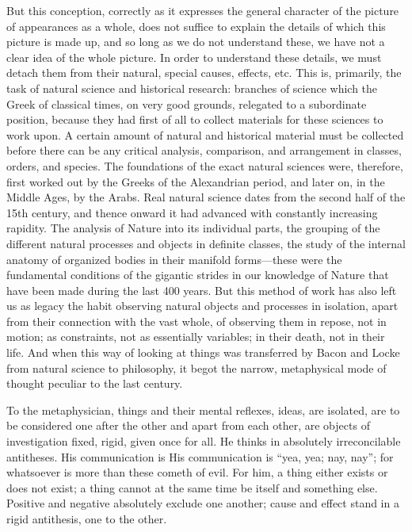 But this conception, correctly as it expresses the general character of the
picture of appearances as a whole, does not suffice to explain the details of
which this picture is made up, and so long as we do not understand these, we
have not a clear idea of the whole picture. In order to understand these
details, we must detach them from their natural, special causes, effects, etc.
This is, primarily, the task of natural science and historical research:
branches of science which the Greek of classical times, on very good grounds,
relegated to a subordinate position, because they had first of all to collect
materials for these sciences to work upon. A certain amount of natural and
historical material must be collected before there can be any critical
analysis, comparison, and arrangement in classes, orders, and species. The
foundations of the exact natural sciences were, therefore, first worked out by
the Greeks of the Alexandrian period, and later on, in the Middle Ages, by the Arabs. Real natural science dates
from the second half of the 15th century, and thence onward it had advanced
with constantly increasing rapidity. The analysis of Nature into its individual
parts, the grouping of the different natural processes and objects in definite
classes, the study of the internal anatomy of organized bodies in their
manifold forms---these were the fundamental conditions of the gigantic strides
in our knowledge of Nature that have been made during the last 400 years. But
this method of work has also left us as legacy the habit observing natural
objects and processes in isolation, apart from their connection with the vast
whole, of observing them in repose, not in motion; as constraints, not as
essentially variables; in their death, not in their life. And when this way of
looking at things was transferred by Bacon and Locke from natural science to
philosophy, it begot the narrow, metaphysical mode of thought peculiar to the
last century.

To the metaphysician, things and their mental reflexes, ideas, are isolated, are
to be considered one after the other and apart from each other, are objects of
investigation fixed, rigid, given once for all. He thinks in absolutely
irreconcilable antitheses. His communication is His communication is ``yea, yea;
nay, nay''; for whatsoever is more than these cometh of evil. For him, a thing
either exists or does not exist; a thing cannot at the same time be itself and
something else. Positive and negative absolutely exclude one another; cause and
effect stand in a rigid antithesis, one to the other.

